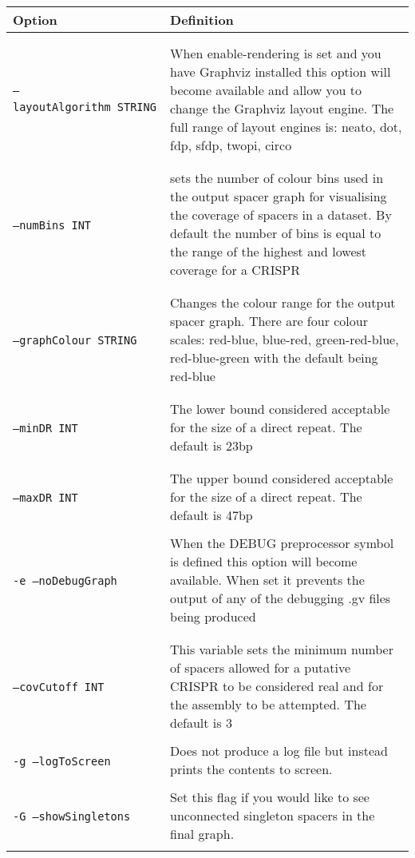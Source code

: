 \documentclass[11pt]{article} %
\newcommand{\optionflag}[1]{\texttt{-#1}}
\newcommand{\optionflagarg}[2]{\optionflag{#1}\ \texttt{#2}}
\newcommand{\longoptionflag}[1]{\texttt{--#1}}
\newcommand{\longoptionflagarg}[2]{\longoptionflag{#1}\ \texttt{#2}}
\newcommand{\combinedoptionflag}[2]{\optionflag{#1}\ \longoptionflag{#2}}
\newcommand{
	\combinedoptionflagarg}[3]{
		\shortstack[l]{
			\optionflagarg{#1}{#3} \\ \longoptionflagarg{#2}{#3}
		}
	}
\begin{document}
    \begin{longtable}{  l   p{10cm} }
    \hline
    Option & Definition \\  \hline\hline
\\
    \combinedoptionflagarg{a}{layoutAlgorithm}{STRING} &   When enable-rendering is set and you have Graphviz installed this option will become available and allow you to change the Graphviz layout engine.  The full range of layout engines is: neato, dot, fdp, sfdp, twopi, circo \\ \\
\combinedoptionflagarg{b}{numBins}{INT} &  sets the number of colour bins used in the output spacer graph for visualising the coverage of spacers in a dataset.  By default the number of bins is equal to the range of the highest and lowest coverage for a CRISPR \\ \\
\combinedoptionflagarg{c}{graphColour}{STRING} & Changes the colour range for the output spacer graph.  There are four colour scales: red-blue, blue-red, green-red-blue, red-blue-green with the default being red-blue\\ \\
\combinedoptionflagarg{d}{minDR}{INT} & The lower bound considered acceptable for the size of a direct repeat.  The default is 23bp\\ \\
\combinedoptionflagarg{D}{maxDR}{INT} & The upper bound considered acceptable for the size of a direct repeat. The default is 47bp\\ \\
\combinedoptionflag{e}{noDebugGraph} & When the DEBUG preprocessor symbol is defined this option will become available.  When set it prevents the output of any of the debugging .gv files being produced \\ \\
\combinedoptionflagarg{f}{covCutoff}{INT} & This variable sets the minimum number of spacers allowed for a putative CRISPR to be considered real and for the assembly to be attempted.  The default is 3  \\ \\
\combinedoptionflag{g}{logToScreen} & Does not produce a log file but instead prints the contents to screen.\\ \\
\combinedoptionflag{G}{showSingletons} & Set this flag if you would like to see unconnected singleton spacers in the final graph.\\ \\

\end{longtable}
\end{document}
